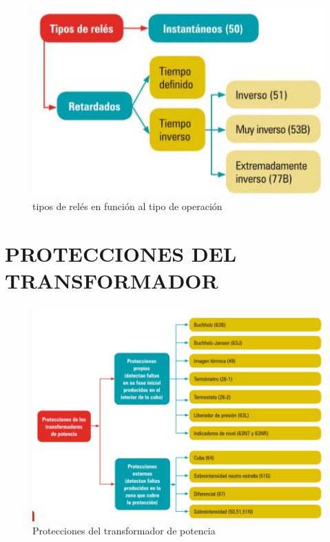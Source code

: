 \documentclass[a5paper]{book}%
\begin{document}
\begin{figure}[H]
      \centering
      
      \caption{tipos de relés en función al tipo de operación}
      \label{fig:tiporele}
      \includegraphics[width=\linewidth]{tipos_rele}
    \end{figure}



    \section{PROTECCIONES DEL TRANSFORMADOR}

    \begin{figure}[H]
      \centering  
      \caption{Protecciones del transformador de potencia}
      \label{fig:proteccionestrafo}
      \includegraphics[width=\linewidth]{proteccion_trafo}
    \end{figure}
\end{document}
